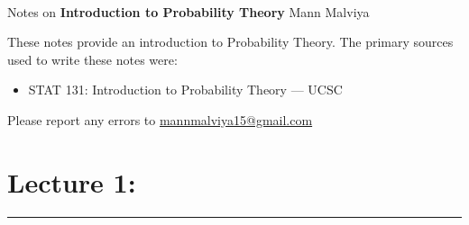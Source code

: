 \documentclass[11pt]{article}
\begin{document}
\thispagestyle{empty}
\bigskip \
\vspace{0.1cm}

\begin{center}
{\fontsize{22}{22} \selectfont Notes on}
\vskip 16pt
{\fontsize{20}{20} \selectfont \bf \sffamily Introduction to Probability Theory}
\vskip 24pt
{\fontsize{18}{18} \selectfont \rmfamily Mann Malviya}
\vskip 6pt
{\fontsize{14}{14} \selectfont {}}
\vskip 24pt
\end{center}

{\parindent0pt \baselineskip=15.5pt These notes provide an introduction to Probability Theory. The primary sources used to write these notes were:

\begin{itemize}
    \item STAT 131: Introduction to Probability Theory — UCSC
\end{itemize}

Please report any errors to \href{mailto:mannmalviya15@gmail.com}{mannmalviya15@gmail.com}


}

\newpage
\tableofcontents
\newpage

\section*{Lecture 1:}

\begin{center}
	\rule{450pt}{1pt} 
\end{center}
\newpage
\end{document}
